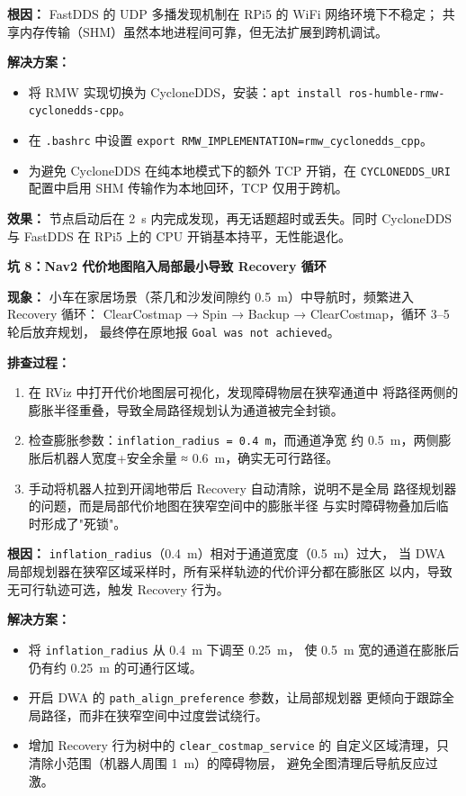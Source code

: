 \documentclass[11pt,a4paper]{article}
\begin{document}
\textbf{根因：}
FastDDS 的 UDP 多播发现机制在 RPi5 的 WiFi 网络环境下不稳定；
共享内存传输（SHM）虽然本地进程间可靠，但无法扩展到跨机调试。

\textbf{解决方案：}
\begin{itemize}
  \item 将 RMW 实现切换为 CycloneDDS，安装：\texttt{apt install ros-humble-rmw-cyclonedds-cpp}。
  \item 在 \texttt{.bashrc} 中设置 \texttt{export RMW\_IMPLEMENTATION=rmw\_cyclonedds\_cpp}。
  \item 为避免 CycloneDDS 在纯本地模式下的额外 TCP 开销，在
        \texttt{CYCLONEDDS\_URI} 配置中启用 SHM 传输作为本地回环，TCP 仅用于跨机。
\end{itemize}

\textbf{效果：}
节点启动后在 2~s 内完成发现，再无话题超时或丢失。同时 CycloneDDS 与 FastDDS
在 RPi5 上的 CPU 开销基本持平，无性能退化。

\vspace{2em}

\textbf{坑 8：Nav2 代价地图陷入局部最小导致 Recovery 循环}

\textbf{现象：}
小车在家居场景（茶几和沙发间隙约 0.5~m）中导航时，频繁进入 Recovery 循环：
ClearCostmap → Spin → Backup → ClearCostmap，循环 3--5 轮后放弃规划，
最终停在原地报 \texttt{Goal was not achieved}。

\textbf{排查过程：}
\begin{enumerate}
  \item 在 RViz 中打开代价地图层可视化，发现障碍物层在狭窄通道中
        将路径两侧的膨胀半径重叠，导致全局路径规划认为通道被完全封锁。
  \item 检查膨胀参数：\texttt{inflation\_radius = 0.4~m}，而通道净宽
        约 0.5~m，两侧膨胀后机器人宽度+安全余量 ≈ 0.6~m，确实无可行路径。
  \item 手动将机器人拉到开阔地带后 Recovery 自动清除，说明不是全局
        路径规划器的问题，而是局部代价地图在狭窄空间中的膨胀半径
        与实时障碍物叠加后临时形成了"死锁"。
\end{enumerate}

\textbf{根因：}
\texttt{inflation\_radius}（0.4~m）相对于通道宽度（0.5~m）过大，
当 DWA 局部规划器在狭窄区域采样时，所有采样轨迹的代价评分都在膨胀区
以内，导致无可行轨迹可选，触发 Recovery 行为。

\textbf{解决方案：}
\begin{itemize}
  \item 将 \texttt{inflation\_radius} 从 0.4~m 下调至 0.25~m，
        使 0.5~m 宽的通道在膨胀后仍有约 0.25~m 的可通行区域。
  \item 开启 DWA 的 \texttt{path\_align\_preference} 参数，让局部规划器
        更倾向于跟踪全局路径，而非在狭窄空间中过度尝试绕行。
  \item 增加 Recovery 行为树中的 \texttt{clear\_costmap\_service} 的
        自定义区域清理，只清除小范围（机器人周围 1~m）的障碍物层，
        避免全图清理后导航反应过激。
\end{itemize}
\end{document}
